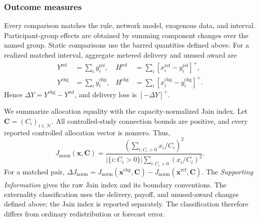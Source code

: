 \documentclass[twoside,twocolumn,9pt]{article}
\newcommand{\suppref}{\textit{Supporting Information}\textsuperscript{\dag}}
\begin{document}
{\subsubsection{Outcome measures}

Every comparison matches the rule, network model, exogenous data, and interval.
Participant-group effects are obtained by summing component changes over the
named group. Static comparisons use the barred quantities defined above. For a
realized matched interval, aggregate metered delivery and unused award are
\begin{align*}
Y^{\mathrm{ref}}&=\sum_i y_i^{\mathrm{ref}}, &
H^{\mathrm{ref}}&=\sum_i[x_i^{\mathrm{ref}}-y_i^{\mathrm{ref}}]^+,\\
Y^{\mathrm{chg}}&=\sum_i y_i^{\mathrm{chg}}, &
H^{\mathrm{chg}}&=\sum_i[x_i^{\mathrm{chg}}-y_i^{\mathrm{chg}}]^+.
\end{align*}
Hence
$\Delta Y=Y^{\mathrm{chg}}-Y^{\mathrm{ref}}$, and delivery loss is
$[-\Delta Y]^+$.

We summarize allocation equality with the capacity-normalized Jain index. Let
$\mathbf C=(C_i)_{i\in\mathcal N}$. All controlled-study connection bounds are
positive, and every reported controlled allocation vector is nonzero. Thus,
\begin{equation}
J_{\mathrm{norm}}(\mathbf x,\mathbf C)
=\frac{(\sum_{i:C_i>0}x_i/C_i)^2}
{|\{i:C_i>0\}|\sum_{i:C_i>0}(x_i/C_i)^2}.
\label{eq:jain_normalized}
\end{equation}
For a matched pair,
$\Delta J_{\mathrm{norm}}=J_{\mathrm{norm}}(\mathbf x^{\mathrm{chg}},\mathbf C)
-J_{\mathrm{norm}}(\mathbf x^{\mathrm{ref}},\mathbf C)$.
The \suppref{} gives the raw Jain index and its boundary conventions.
The externality classification uses the delivery, payoff, and unused-award
changes defined above; the Jain index is reported separately. The classification
therefore differs from ordinary redistribution or forecast error.


}
\end{document}
